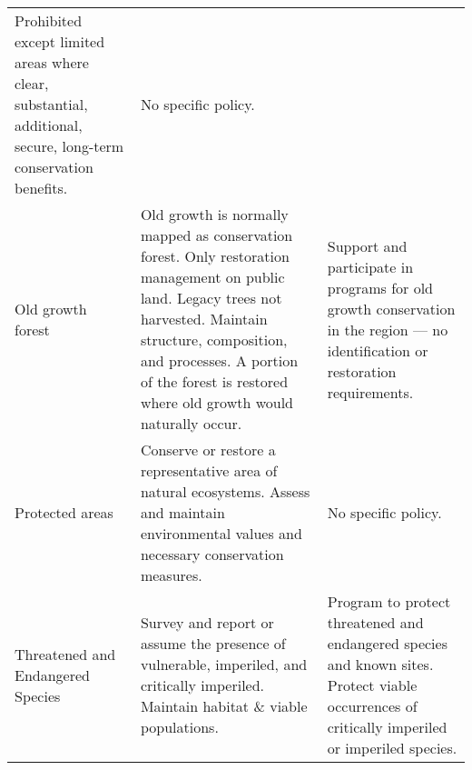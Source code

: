 \documentclass[]{article}
\begin{document}
\begin{longtable}[]{@{}lll@{}}
\begin{minipage}[t]{0.36\columnwidth}
Prohibited except limited areas where clear, substantial, additional,
secure, long-term conservation benefits.\strut
\end{minipage} & \begin{minipage}[t]{0.36\columnwidth}\raggedright\strut
No specific policy.\strut
\end{minipage}\tabularnewline
\begin{minipage}[t]{0.20\columnwidth}\raggedright\strut
Old growth forest\strut
\end{minipage} & \begin{minipage}[t]{0.36\columnwidth}\raggedright\strut
Old growth is normally mapped as conservation forest. Only restoration
management on public land. Legacy trees not harvested. Maintain
structure, composition, and processes. A portion of the forest is
restored where old growth would naturally occur.\strut
\end{minipage} & \begin{minipage}[t]{0.36\columnwidth}\raggedright\strut
Support and participate in programs for old growth conservation in the
region --- no identification or restoration requirements.\strut
\end{minipage}\tabularnewline
\begin{minipage}[t]{0.20\columnwidth}\raggedright\strut
Protected areas\strut
\end{minipage} & \begin{minipage}[t]{0.36\columnwidth}\raggedright\strut
Conserve or restore a representative area of natural ecosystems. Assess
and maintain environmental values and necessary conservation
measures.\strut
\end{minipage} & \begin{minipage}[t]{0.36\columnwidth}\raggedright\strut
No specific policy.\strut
\end{minipage}\tabularnewline
\begin{minipage}[t]{0.20\columnwidth}\raggedright\strut
Threatened and Endangered Species\strut
\end{minipage} & \begin{minipage}[t]{0.36\columnwidth}\raggedright\strut
Survey and report or assume the presence of vulnerable, imperiled, and
critically imperiled. Maintain habitat \& viable populations.\strut
\end{minipage} & \begin{minipage}[t]{0.36\columnwidth}\raggedright\strut
Program to protect threatened and endangered species and known sites.
Protect viable occurrences of critically imperiled or imperiled
species.\strut
\end{minipage}\tabularnewline
\bottomrule
\end{longtable}
\end{document}
